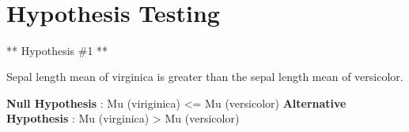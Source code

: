 \documentclass[11pt]{article}
\begin{document}
    \begin{center}
    \end{center}
    { \hspace*{\fill} \\}
    
    \begin{center}
    \end{center}
    { \hspace*{\fill} \\}
    
    \begin{center}
    \end{center}
    { \hspace*{\fill} \\}
    
    \begin{center}
    \end{center}
    { \hspace*{\fill} \\}
    
    \section{Hypothesis Testing}\label{hypothesis-testing}

    ** Hypothesis \#1 **

    Sepal length mean of virginica is greater than the sepal length mean of
versicolor.

    \textbf{Null Hypothesis} : Mu (viriginica) \textless{}= Mu (versicolor)
\textbf{Alternative Hypothesis} : Mu (virginica) \textgreater{} Mu
(versicolor)
\end{document}
